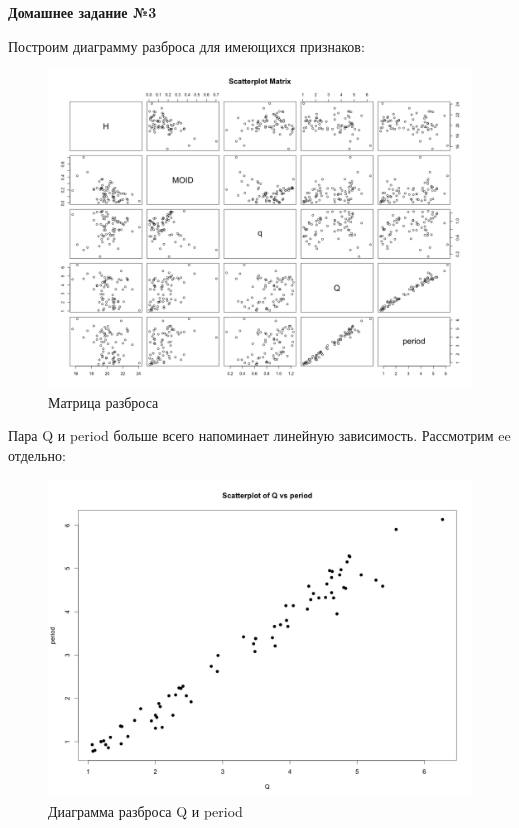 \documentclass{article}
\begin{document}
\large \textbf{Домашнее задание №3}

Построим диаграмму разброса для имеющихся признаков:

\begin{figure}[H] 
\centering
\includegraphics[scale=0.4]{img/3_paired_scatter.png}
\caption{Матрица разброса}
\label{fig :metka1}
\end{figure}

Пара Q и period больше всего напоминает линейную зависимость. Рассмотрим ee отдельно:  

\begin{figure}[H] 
\centering
\includegraphics[scale=0.4]{img/3_Q_vs_period.png}
\caption{Диаграмма разброса Q и period}
\label{fig :metka1}
\end{figure}
\end{document}
